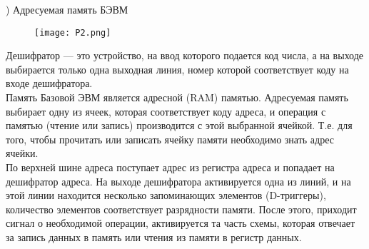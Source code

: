 ) Адресуемая память БЭВМ \\
\begin{figure}[H]
    \centering
    \texttt{[image: P2.png]}
\end{figure}
\noindent Дешифратор — это устройство, на ввод которого подается код числа, а на выходе выбирается только одна выходная линия, номер которой соответствует коду на входе дешифратора. \\
Память Базовой ЭВМ является адресной (RAM) памятью. Адресуемая память выбирает одну из ячеек, которая соответствует коду адреса, и операция с памятью (чтение или запись) производится с этой выбранной ячейкой. Т.е. для того, чтобы прочитать или записать ячейку памяти необходимо знать адрес ячейки. \\
По верхней шине адреса поступает адрес из регистра адреса и попадает на дешифратор адреса. На выходе дешифратора активируется одна из линий, и на этой линии находится несколько запоминающих элементов (D-триггеры), количество элементов соответствует разрядности памяти. После этого, приходит сигнал о необходимой операции, активируется та часть схемы, которая отвечает за запись данных в память или чтения из памяти в регистр данных. \\

